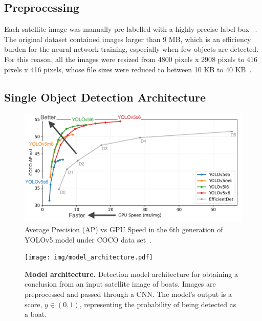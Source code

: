 \subsection{Preprocessing}
Each satellite image was manually pre-labelled with a highly-precise label box ~\cite{lutherborrowship}. The original dataset contained images larger than 9 MB, which is an efficiency burden for the neural network training, especially when few objects are detected. For this reason, all the images were resized from 4800 pixels x 2908 pixels to 416 pixels x 416 pixels, whose file sizes were reduced to between 10 KB to 40 KB~\cite{nelson_2020}. 


\subsection{Single Object Detection Architecture}
\label{III-D-Detection-Architecture}

\begin{figure}[t]
    \center
    \includegraphics[width=\columnwidth]{img/YOLOv5_Performance.png}
    \caption{{Average Precision (AP) vs GPU Speed in the 6th generation of YOLOv5 model under COCO data set~\cite{glenn_jocher_2020_4154370}.}}
    \label{fig:YOLOv5_Performance}
\end{figure}

\begin{figure}[!t]
    \centering
    \texttt{[image: img/model\_architecture.pdf]}
    \caption{\textbf{Model architecture.} Detection model architecture for obtaining a conclusion from an input satellite image of boats.  Images are preprocessed and passed through a CNN. The model's output is a score, $y \in (0,1)$, representing the probability of being detected as a boat.}
    \label{model_architecture}
\end{figure}


